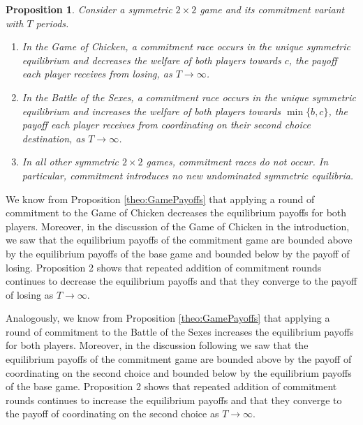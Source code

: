 \documentclass[letterpaper]{article}
\newcommand{\bparam}{b}
\newcommand{\cparam}{c}
\newtheorem{proposition}[theorem]{Proposition}
\theoremstyle{definition}
\begin{document}
\begin{proposition}\label{theo:convergence}
    Consider a symmetric $2\times2$ game and its commitment variant with $T$ periods.
    \begin{enumerate}
        \item In the Game of Chicken, a commitment race occurs in the unique symmetric equilibrium and decreases the welfare of both players towards $\cparam$, the payoff each player receives from losing, as $T \to \infty$.
        \item In the Battle of the Sexes, a commitment race occurs in the unique symmetric equilibrium and increases the welfare of both players towards $\min\{\bparam,\cparam\}$, the payoff each player receives from coordinating on their second choice destination, as $T \to \infty$.
        \item In all other symmetric $2\times2$ games, commitment races do not occur. In particular, commitment introduces no new undominated symmetric equilibria.
    \end{enumerate}
\end{proposition}

We know from Proposition \ref{theo:GamePayoffs} that applying a round of commitment to the Game of Chicken decreases the equilibrium payoffs for both players. Moreover, in the discussion of the Game of Chicken in the introduction, we saw that the equilibrium payoffs of the commitment game are bounded above by the equilibrium payoffs of the base game and bounded below by the payoff of losing. Proposition 2 shows that repeated addition of commitment rounds continues to decrease the equilibrium payoffs and that they converge to the payoff of losing as $T \to \infty$.

Analogously, we know from Proposition \ref{theo:GamePayoffs} that applying a round of commitment to the Battle of the Sexes increases the equilibrium payoffs for both players. Moreover, in the discussion following we saw that the equilibrium payoffs of the commitment game are bounded above by the payoff of coordinating on the second choice and bounded below by the equilibrium payoffs of the base game. Proposition 2 shows that repeated addition of commitment rounds continues to increase the equilibrium payoffs and that they converge to the payoff of coordinating on the second choice as $T \to \infty$.
\end{document}
